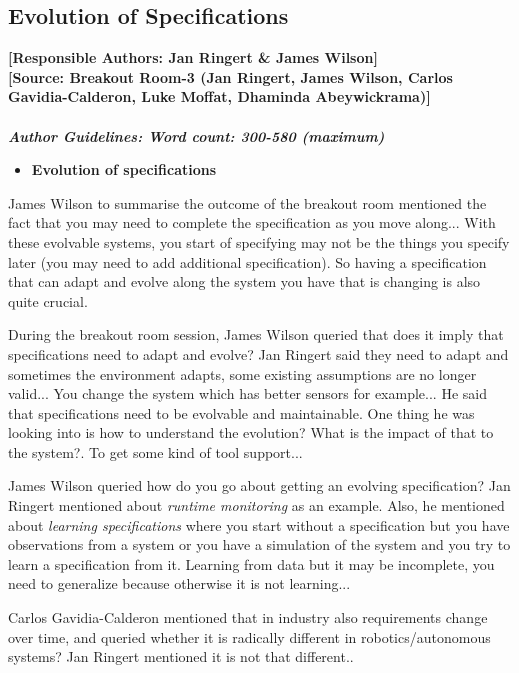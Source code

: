 \documentclass[sigconf]{acmart}
\begin{document}
\subsection{Evolution of Specifications}
\noindent\textbf{[Responsible Authors:  Jan Ringert \& James Wilson]}\\
\noindent \textbf{[Source: Breakout Room-3 (Jan Ringert, James Wilson, Carlos Gavidia-Calderon, Luke Moffat, Dhaminda Abeywickrama)]}\\\\
\noindent\textbf{\textit{Author Guidelines: Word count: 300-580 (maximum)}}\\
\begin{itemize}
	\item \textbf{Evolution of specifications}
\end{itemize}
James Wilson to summarise the outcome of the breakout room mentioned the fact that you may need to complete the specification as you move along... With these evolvable systems, you start of specifying may not be the things you specify later (you may need to add additional specification). So having a specification that can adapt and evolve along the system you have that is changing is also quite crucial.

During the breakout room session, James Wilson queried that does it imply that specifications need to adapt and evolve?
Jan Ringert said they need to adapt and sometimes the environment adapts, some existing assumptions are no longer valid... You change the system which has better sensors for example... He said that specifications need to be evolvable and maintainable. One thing he was looking into is how to understand the evolution? What is the impact of that to the system?. To get some kind of tool support... 

James Wilson queried how do you go about getting an evolving specification? Jan Ringert mentioned about \textit{runtime monitoring }as an example.  Also, he mentioned about \textit{learning specifications} where you start without a specification but you have observations from a system or you have a simulation of the system and you try to learn a specification from it. Learning from data but it may be incomplete, you need to generalize because otherwise it is not learning...

Carlos Gavidia-Calderon mentioned that in industry also requirements change over time, and queried whether it is radically different in  robotics/autonomous systems? Jan Ringert mentioned it is not that different..
\end{document}
